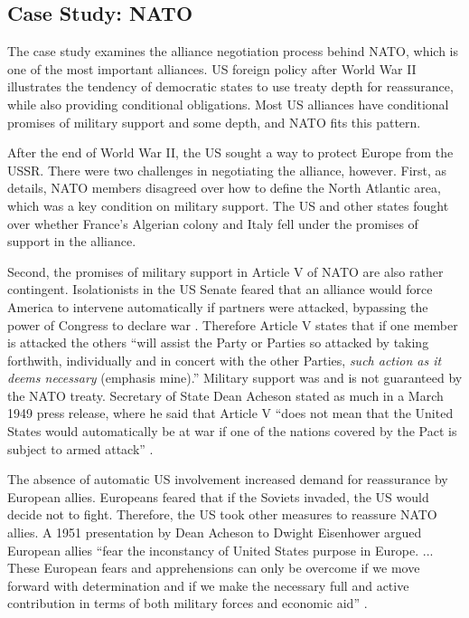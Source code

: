 \documentclass[12pt]{article}
\begin{document}
\subsection{Case Study: NATO}


The case study examines the alliance negotiation process behind NATO, which is one of the most important alliances.
US foreign policy after World War II illustrates the tendency of democratic states to use treaty depth for reassurance, while also providing conditional obligations.  
Most US alliances have conditional promises of military support and some depth, and NATO fits this pattern. 


After the end of World War II, the US sought a way to protect Europe from the USSR. 
There were two challenges in negotiating the alliance, however.
First, as \citet{Poast2019a} details, NATO members disagreed over how to define the North Atlantic area, which was a key condition on military support. 
The US and other states fought over whether France's Algerian colony and Italy fell under the promises of support in the alliance. 


Second, the promises of military support in Article V of NATO are also rather contingent. 
Isolationists in the US Senate feared that an alliance would force America to intervene automatically if partners were attacked, bypassing the power of Congress to declare war \citep[pg. 280-1]{Acheson1969}.
Therefore Article V states that if one member is attacked the others ``will assist the Party or Parties so attacked by taking forthwith, individually and in concert with the other Parties, \emph{such action as it deems necessary} (emphasis mine).'' 
Military support was and is not guaranteed by the NATO treaty. 
Secretary of State Dean Acheson stated as much in a March 1949 press release, where he said that Article V ``does not mean that the United States would automatically be at war if one of the nations covered by the Pact is subject to armed attack'' \citep{Acheson1949}. 


The absence of automatic US involvement increased demand for reassurance by European allies. 
Europeans feared that if the Soviets invaded, the US would decide not to fight. 
Therefore, the US took other measures to reassure NATO allies. 
A 1951 presentation by Dean Acheson to Dwight Eisenhower argued European allies ``fear the inconstancy of United States purpose in Europe. ... These European fears and apprehensions can only be overcome if we move forward with determination and if we make the necessary full and active contribution in terms of both military forces and economic aid'' \citep[pg. 3]{Acheson1951}. 
\end{document}
